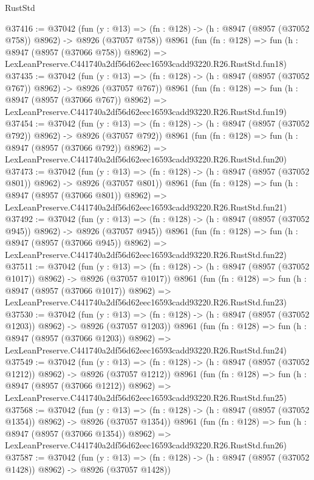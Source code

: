 \begin{lexlean}{RustStd}
\begin{coremodule}
@37416 := @37042
    (fun (y : @13) => (fn : @128) -> (h : @8947 (@8957 (@37052 @758)) @8962) -> @8926 (@37057 @758))
    @8961
    (fun (fn : @128) =>
    fun (h : @8947 (@8957 (@37066 @758)) @8962) =>
    LexLeanPreserve.C441740a2df56d62eec16593cadd93220.R26.RustStd.fun18)
@37435 := @37042
    (fun (y : @13) => (fn : @128) -> (h : @8947 (@8957 (@37052 @767)) @8962) -> @8926 (@37057 @767))
    @8961
    (fun (fn : @128) =>
    fun (h : @8947 (@8957 (@37066 @767)) @8962) =>
    LexLeanPreserve.C441740a2df56d62eec16593cadd93220.R26.RustStd.fun19)
@37454 := @37042
    (fun (y : @13) => (fn : @128) -> (h : @8947 (@8957 (@37052 @792)) @8962) -> @8926 (@37057 @792))
    @8961
    (fun (fn : @128) =>
    fun (h : @8947 (@8957 (@37066 @792)) @8962) =>
    LexLeanPreserve.C441740a2df56d62eec16593cadd93220.R26.RustStd.fun20)
@37473 := @37042
    (fun (y : @13) => (fn : @128) -> (h : @8947 (@8957 (@37052 @801)) @8962) -> @8926 (@37057 @801))
    @8961
    (fun (fn : @128) =>
    fun (h : @8947 (@8957 (@37066 @801)) @8962) =>
    LexLeanPreserve.C441740a2df56d62eec16593cadd93220.R26.RustStd.fun21)
@37492 := @37042
    (fun (y : @13) => (fn : @128) -> (h : @8947 (@8957 (@37052 @945)) @8962) -> @8926 (@37057 @945))
    @8961
    (fun (fn : @128) =>
    fun (h : @8947 (@8957 (@37066 @945)) @8962) =>
    LexLeanPreserve.C441740a2df56d62eec16593cadd93220.R26.RustStd.fun22)
@37511 := @37042
    (fun (y : @13) =>
    (fn : @128) -> (h : @8947 (@8957 (@37052 @1017)) @8962) -> @8926 (@37057 @1017))
    @8961
    (fun (fn : @128) =>
    fun (h : @8947 (@8957 (@37066 @1017)) @8962) =>
    LexLeanPreserve.C441740a2df56d62eec16593cadd93220.R26.RustStd.fun23)
@37530 := @37042
    (fun (y : @13) =>
    (fn : @128) -> (h : @8947 (@8957 (@37052 @1203)) @8962) -> @8926 (@37057 @1203))
    @8961
    (fun (fn : @128) =>
    fun (h : @8947 (@8957 (@37066 @1203)) @8962) =>
    LexLeanPreserve.C441740a2df56d62eec16593cadd93220.R26.RustStd.fun24)
@37549 := @37042
    (fun (y : @13) =>
    (fn : @128) -> (h : @8947 (@8957 (@37052 @1212)) @8962) -> @8926 (@37057 @1212))
    @8961
    (fun (fn : @128) =>
    fun (h : @8947 (@8957 (@37066 @1212)) @8962) =>
    LexLeanPreserve.C441740a2df56d62eec16593cadd93220.R26.RustStd.fun25)
@37568 := @37042
    (fun (y : @13) =>
    (fn : @128) -> (h : @8947 (@8957 (@37052 @1354)) @8962) -> @8926 (@37057 @1354))
    @8961
    (fun (fn : @128) =>
    fun (h : @8947 (@8957 (@37066 @1354)) @8962) =>
    LexLeanPreserve.C441740a2df56d62eec16593cadd93220.R26.RustStd.fun26)
@37587 := @37042
    (fun (y : @13) =>
    (fn : @128) -> (h : @8947 (@8957 (@37052 @1428)) @8962) -> @8926 (@37057 @1428))

\end{coremodule}
\end{lexlean}

